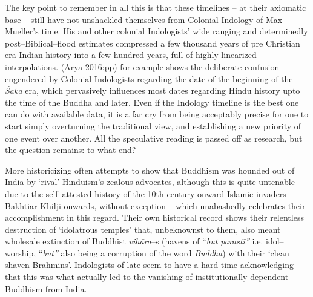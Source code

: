 The key point to remember in all this is that these timelines – at their axiomatic base – still have not unshackled themselves from Colonial Indology of Max Mueller’s time. His and other colonial Indologists’ wide ranging and determinedly post–Biblical–flood estimates compressed a few thousand years of pre Christian era Indian history into a few hundred years, full of highly linearized interpolations. (Arya 2016:pp) for example shows the deliberate confusion engendered by Colonial Indologists regarding the date of the beginning of the \textit{Śaka} era, which pervasively influences most dates regarding Hindu history upto the time of the Buddha and later. Even if the Indology timeline is the best one can do with available data, it is a far cry from being acceptably precise for one to start simply overturning the traditional view, and establishing a new priority of one event over another. All the speculative reading is passed off as research, but the question remains: to what end?

More historicizing often attempts to show that Buddhism was hounded out of India by ‘rival’ Hinduism’s zealous advocates, although this is quite untenable due to the self–attested history of the 10th century onward Islamic invaders – Bakhtiar Khilji onwards, without exception – which unabashedly celebrates their accomplishment in this regard. Their own historical record shows their relentless destruction of ‘idolatrous temples’ that, unbeknownst to them, also meant wholesale extinction of Buddhist \textit{vihāra}–s (havens of “\textit{but parastī”} i.e. idol–worship, “\textit{but”} also being a corruption of the word \textit{Buddha}) with their ‘clean shaven Brahmins’. Indologists of late seem to have a hard time acknowledging that this was what actually led to the vanishing of institutionally dependent Buddhism from India.

